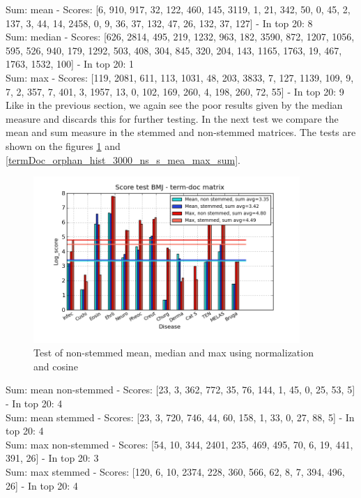 Sum: mean - Scores: [6, 910, 917, 32, 122, 460, 145, 3119, 1, 21, 342, 50, 0, 45, 2, 137, 3, 44, 14, 2458, 0, 9, 36, 37, 132, 47, 26, 132, 37, 127] - In top 20: 8 \\
Sum: median - Scores: [626, 2814, 495, 219, 1232, 963, 182, 3590, 872, 1207, 1056, 595, 526, 940, 179, 1292, 503, 408, 304, 845, 320, 204, 143, 1165, 1763, 19, 467, 1763, 1532, 100] - In top 20: 1 \\
Sum: max - Scores: [119, 2081, 611, 113, 1031, 48, 203, 3833, 7, 127, 1139, 109, 9, 7, 2, 357, 7, 401, 3, 1957, 13, 0, 102, 169, 260, 4, 198, 260, 72, 55] - In top 20: 9 \\

Like in the previous section, we again see the poor results given by the median measure and discards this for further testing. In the next test we compare the mean and sum measure in the stemmed and non-stemmed matrices. The tests are shown on the figures \ref{termDoc_bmj_hist_3000_ns_s_mea_max_sum} and \ref{termDoc_orphan_hist_3000_ns_s_mea_max_sum}.

\begin{figure}[h!]
        \begin{center}
          \includegraphics[width=0.9\textwidth]{barcharts/termDoc_bmj_hist_3000_ns_s_mea_max_sum.png}
        \end{center}
        \caption{Test of non-stemmed mean, median and max using normalization and cosine}
        \label{termDoc_bmj_hist_3000_ns_s_mea_max_sum}
\end{figure} 

Sum: mean non-stemmed - Scores: [23, 3, 362, 772, 35, 76, 144, 1, 45, 0, 25, 53, 5] - In top 20: 4 \\
Sum: mean stemmed - Scores: [23, 3, 720, 746, 44, 60, 158, 1, 33, 0, 27, 88, 5] - In top 20: 4 \\
Sum: max non-stemmed - Scores: [54, 10, 344, 2401, 235, 469, 495, 70, 6, 19, 441, 391, 26] - In top 20: 3 \\
Sum: max stemmed - Scores: [120, 6, 10, 2374, 228, 360, 566, 62, 8, 7, 394, 496, 26] - In top 20: 4

